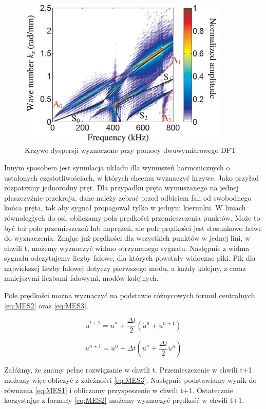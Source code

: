 \begin{figure}[h]
\centering
\includegraphics[width=10cm]{Zdjecia/2/dyspersja_tian1}
\caption{Krzywe dyspersji wyznaczone przy pomocy dwuwymiarowego DFT}
\label{fig:krzywe_dyspersji_tian1}
\end{figure}

Innym sposobem jest symulacja układu dla wymuszeń harmonicznych o ustalonych częstotliwościach, w których chcemu wyznaczyć krzywe. Jako przyład rozpatrzmy jednorodny pręt. Dla przypadku pręta wymuszanego na jednej płaszczyźnie przekroju, dane należy zebrać przed odbiciem fali od swobodnego końca pręta, tak aby sygnał propagował tylko w jednym kierunku. W liniach równoległych do osi, obliczamy pola prędkości przemieszczenia punktów. Może to być też pole przemieszczeń lub naprężeń, ale pole prędkości jest stosunkowo łatwe do wyznaczenia.
Znając już prędkości dla wszystkich punktów w jednej lini, w chwili t, możemy wyznaczyć widmo otrzymanego sygnału. Następnie z widma sygnału odczytujemy liczby falowe, dla których powstały widoczne piki. Pik dla największej liczby falowej dotyczy pierwszego modu, a każdy kolejny, z coraz mniejszymi liczbami falowymi, modów kolejnych.

Pole prędkości można wyznaczyć na podstawie różnycowych formuł centralnych \ref{eq:MES2} oraz \ref{eq:MES3}.

\begin{equation} \label{eq:MES2}
\dot u^{t+1} = \dot u^n + \frac{\Delta t}{2}(\ddot u^n + \ddot u^{n+1})
\end{equation}

\begin{equation} \label{eq:MES3}
u^{n+1} = u^n + \Delta t(\dot u^n + \frac{\Delta t}{2}\ddot u^n)
\end{equation}

Załóżmy, że znamy pełne rozwiązanie w chwili t. Przemieszczenie w chwili t+1 możemy więc obliczyć z zależności \ref{eq:MES3}. Następnie podstawiamy wynik do równania \ref{eq:MES1} i obliczamy przyspeszenie w chwili t+1. Ostatecznie korzystając z formuły \ref{eq:MES2} możemy wyznaczyć prędkość w chwili t+1.

